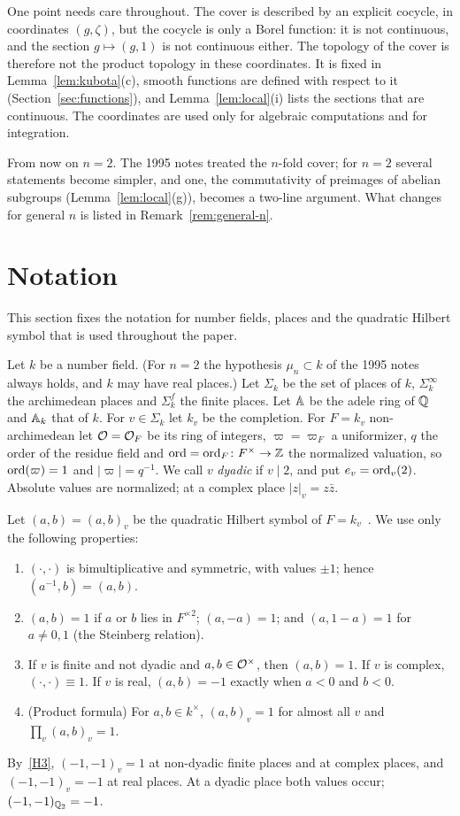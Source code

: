 One point needs care throughout. The cover is described by an explicit
cocycle, in coordinates $(g,\zeta)$, but the cocycle is only a Borel
function: it is not continuous, and the section $g\mapsto(g,1)$ is not
continuous either. The topology of the cover is therefore not the
product topology in these coordinates. It is fixed in
Lemma~\ref{lem:kubota}(c), smooth functions are defined with respect to
it (Section~\ref{sec:functions}), and Lemma~\ref{lem:local}(i) lists the
sections that are continuous. The coordinates are used only for
algebraic computations and for integration.

From now on $n=2$. The 1995 notes treated the $n$-fold cover; for
$n=2$ several statements become simpler, and one, the
commutativity of preimages of abelian subgroups
(Lemma~\ref{lem:local}(g)), becomes a two-line argument. What changes
for general $n$ is listed in Remark~\ref{rem:general-n}.

\section*{Notation}

This section fixes the notation for number fields, places and the
quadratic Hilbert symbol that is used throughout the paper.


Let $k$ be a number field. (For $n=2$ the hypothesis
$\mu_n\subset k$ of the 1995 notes always holds, and $k$ may have real
places.) Let $\Sigma_k$ be the set of places of $k$, $\Sigma_k^\infty$
the archimedean places and $\Sigma_k^f$ the finite places. Let $\mathbb{A}$ be
the adele ring of $\mathbb{Q}$ and $\mathbb{A}_k$ that of $k$. For $v\in\Sigma_k$ let
$k_v$ be the completion. For $F=k_v$ non-archimedean let $\mathcal{O}=\mathcal{O}_F$ be
its ring of integers, $\varpi=\varpi_F$ a uniformizer, $q$ the order of
the residue field and $\operatorname{ord}=\operatorname{ord}_F\colon F^\times\to\mathbb{Z}$ the normalized
valuation, so $\operatorname{ord}(\varpi)=1$ and $|\varpi|=q^{-1}$. We call $v$
\emph{dyadic} if $v\mid 2$, and put $e_v=\operatorname{ord}_v(2)$. Absolute values
are normalized; at a complex place $|z|_v=z\bar z$.

Let $(a,b)=(a,b)_v$ be the quadratic Hilbert symbol of
$F=k_v$~\cite{We74,Se73}. We use only the following properties:
\begin{enumerate}[label=(H\arabic*)]
\item\label{H1} $(\cdot,\cdot)$ is bimultiplicative and symmetric,
  with values $\pm1$; hence $(a^{-1},b)=(a,b)$.
\item\label{H2} $(a,b)=1$ if $a$ or $b$ lies in $F^{\times2}$;
  $(a,-a)=1$; and $(a,1-a)=1$ for $a\neq 0,1$ (the Steinberg relation).
\item\label{H3} If $v$ is finite and not dyadic and $a,b\in\mathcal{O}^\times$,
  then $(a,b)=1$. If $v$ is complex, $(\cdot,\cdot)\equiv1$. If $v$
  is real, $(a,b)=-1$ exactly when $a<0$ and $b<0$.
\item\label{H4} (Product formula) For $a,b\in k^\times$,
  $(a,b)_v=1$ for almost all $v$ and $\prod_v(a,b)_v=1$.
\end{enumerate}
By~\ref{H3}, $(-1,-1)_v=1$ at non-dyadic finite places and at complex
places, and $(-1,-1)_v=-1$ at real places. At a dyadic place both values
occur; $(-1,-1)_{\mathbb{Q}_2}=-1$.

